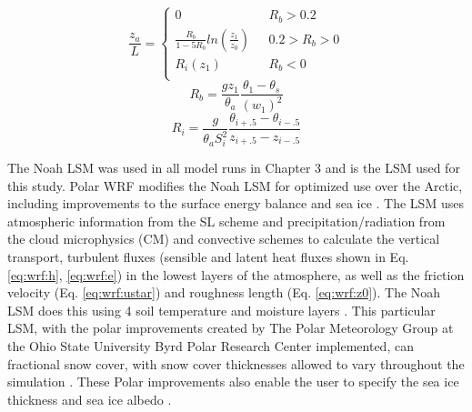 \begin{equation}\label{eq:wrf:zal}
\frac{z_{a}}{L} = \begin{cases} 
0 & \text{    } R_{b} > 0.2 \\ 
\frac{R_{b}}{1-5R_{b}}ln(\frac{z_{1}}{z_{0}}) & \text{    } 0.2 > R_{b} > 0 \\ 
R_{i} ( z_{1} ) & \text{    }R_{b} < 0  \\ 
\end{cases}
\end{equation}
\begin{equation}\label{eq:wrf:rb}
R_{b} = \frac{gz_{1}}{\theta_{a}}\frac{\theta_{1} - \theta_{s}}{(w_{1})^{2}}
\end{equation}
\begin{equation}\label{eq:wrf:ri}
R_{i} = \frac{g}{\theta_{a}S_{i}^{2}} \frac{\theta_{i+.5} - \theta_{i-.5}}{z_{i+.5} - z_{i-.5}}
\end{equation}

The Noah LSM \citep{chen:2001} was used in all model runs in Chapter 3 and is the LSM used for this study. Polar WRF modifies the Noah LSM for optimized use over the Arctic, including improvements to the surface energy balance and sea ice \citep{hines:2015, bromwich:2009}. The LSM uses atmospheric information from the SL scheme and precipitation/radiation from the cloud microphysics (CM) and convective schemes to calculate the vertical transport, turbulent fluxes (sensible and latent heat fluxes shown in Eq. \ref{eq:wrf:h}, \ref{eq:wrf:e}) in the lowest layers of the atmosphere, as well as the friction velocity (Eq. \ref{eq:wrf:ustar}) and roughness length (Eq. \ref{eq:wrf:z0}). The Noah LSM does this using 4 soil temperature and moisture layers \citep{dudhia:2014, skamarock:2019}. This particular LSM, with the polar improvements created by The Polar Meteorology Group at the Ohio State University Byrd Polar Research Center implemented, can fractional snow cover, with snow cover thicknesses allowed to vary throughout the simulation \cite{chen:2001}. These Polar improvements also enable the user to specify the sea ice thickness and sea ice albedo \citep{hines:2015}.

